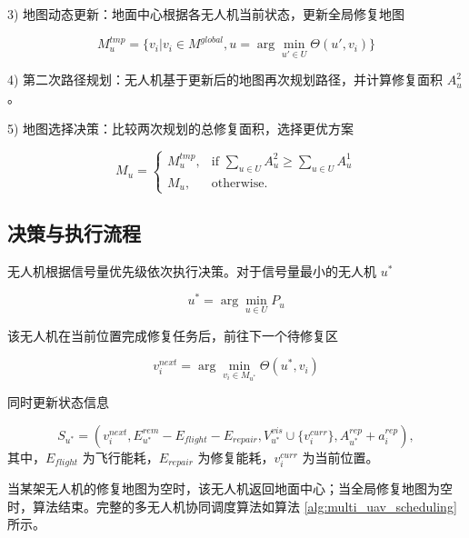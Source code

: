 \documentclass[AutoFakeBold]{LZUThesis}
\begin{document}
3) 地图动态更新：地面中心根据各无人机当前状态，更新全局修复地图

\begin{equation}
	M_u^{tmp} = \{v_i | v_i \in M^{global}, u = \arg\min_{u' \in U} \Theta(u',v_i)\}
\end{equation}

4) 第二次路径规划：无人机基于更新后的地图再次规划路径，并计算修复面积 $A_u^2$。

5) 地图选择决策：比较两次规划的总修复面积，选择更优方案

\begin{equation}
	M_u =
	\begin{cases}
		M_u^{tmp}, & \text{if } \sum_{u \in U} A_u^2 \geq \sum_{u \in U} A_u^1 \\
		M_u,       & \text{otherwise}.
	\end{cases}
\end{equation}

\subsection{决策与执行流程}

无人机根据信号量优先级依次执行决策。对于信号量最小的无人机 $u^*$

\begin{equation}
	u^* = \arg\min_{u \in U} P_u
\end{equation}

该无人机在当前位置完成修复任务后，前往下一个待修复区

\begin{equation}
	v_i^{next} = \arg\min_{v_i \in M_{u^*}} \Theta(u^*,v_i)
\end{equation}

同时更新状态信息

\begin{equation}
	S_{u^*} = (v_i^{next}, E_{u^*}^{rem} - E_{flight} - E_{repair}, V_{u^*}^{vis} \cup \{v_i^{curr}\}, A_{u^*}^{rep} + a_i^{rep}),
\end{equation}
其中，$E_{flight}$ 为飞行能耗，$E_{repair}$ 为修复能耗，$v_i^{curr}$ 为当前位置。

当某架无人机的修复地图为空时，该无人机返回地面中心；当全局修复地图为空时，算法结束。完整的多无人机协同调度算法如算法 \ref{alg:multi_uav_scheduling} 所示。
\end{document}
